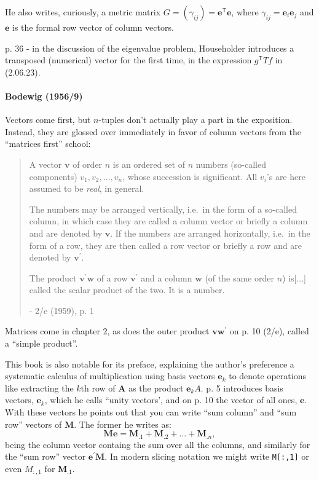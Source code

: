 He also writes, curiously, a metric matrix $G = (\gamma_{ij}) = \mathbf e^{\mathsf T} \mathbf e$,
where $\gamma_{ij} = \mathbf e_i \mathbf e_j$ and $\mathbf e$ is the formal row vector of column vectors.

p. 36 - in the discussion of the eigenvalue problem, Householder introduces a
transposed (numerical) vector for the first time, in the expression $g^{\mathsf T}Tf$
 in (2.06.23).



\paragraph{Bodewig (1956/9)~\cite{Bodewig1956}}

Vectors come first, but $n$-tuples don't actually play a part in the exposition.
Instead, they are glossed over immediately in favor of column vectors from the
``matrices first'' school:

\begin{quote}
A vector $\mathbf v$ of order $n$ is an ordered set of $n$ numbers (so-called
components) $v_1, v_2, \dots, v_n$, whose succession is significant. All $v_i$'s are here
assumed to be \textit{real}, in general.

The numbers may be arranged vertically, i.e.\ in the form of a so-called
column, in which case they are called a column vector or briefly a
column and are denoted by $\mathbf v$. If the numbers are arranged horizontally,
i.e.\ in the form of a row, they are then called a row vector or briefly a
row and are denoted by $\mathbf v^\prime$.

The product $\mathbf v^\prime \mathbf w$ of a row $\mathbf v^\prime$ and a column
$\mathbf w$ (of the same order $n$) is[...] called the scalar product of the two. It is a number.

- 2/e (1959), p. 1
\end{quote}

Matrices come in chapter 2, as does the outer product $\mathbf v \mathbf w^\prime$
on p. 10 (2/e), called a ``simple product''.

This book is also notable for its preface, explaining the author's preference a
systematic calculus of multiplication using basis vectors $\mathbf e_k$ to denote
operations like extracting the $k$th row of $\mathbf A$ as the product $\mathbf e_k A$.
p. 5 introduces basis vectors, $\mathbf e_k$, which he calls ``unity vectors',
and on p. 10 the vector of all ones, $\mathbf e$. With these vectors he points
out that you can write ``sum column'' and ``sum row'' vectors of $\mathbf M$. The
former he writes as:
\[
\mathbf{Me} = \mathbf M_{.1} + \mathbf M_{.2} + \dots + \mathbf M_{.n},
\]
being the column vector containg the sum over all the columns, and similarly for
the ``sum row'' vector $\mathbf{e^\prime M}$. In modern slicing notation we might
write \verb|M[:,1]| or even $M_{:,1}$ for $\mathbf M_{.1}$.

